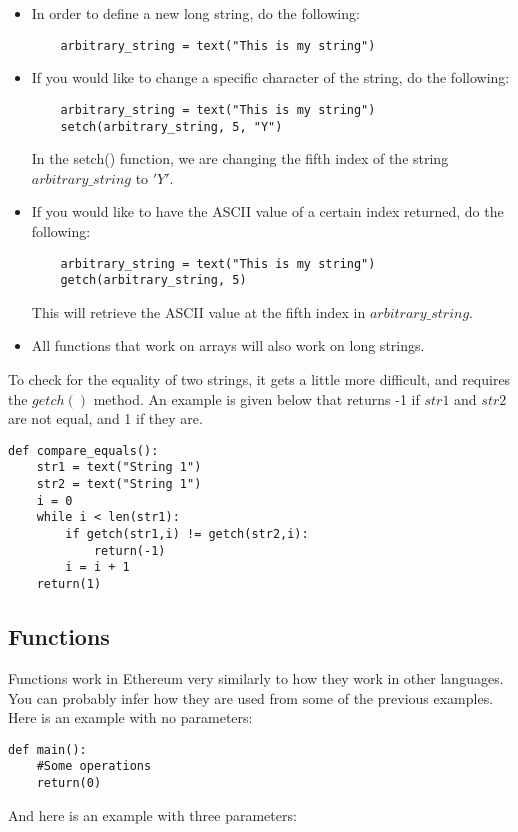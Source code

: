 \documentclass[12pt]{article}
\begin{document}
\begin{itemize}
\item In order to define a new long string, do the following:
	\begin{verbatim}
	arbitrary_string = text("This is my string")
	\end{verbatim}
\item If you would like to change a specific character of the string, do the following:
	\begin{verbatim}
	arbitrary_string = text("This is my string")
	setch(arbitrary_string, 5, "Y")
	\end{verbatim}
	In the setch() function, we are changing the fifth index of the string $arbitrary\_string$ to $'Y'$.
\item If you would like to have the ASCII value of a certain index returned, do the following:
	\begin{verbatim}
	arbitrary_string = text("This is my string")
	getch(arbitrary_string, 5)
	\end{verbatim}
	This will retrieve the ASCII value at the fifth index in $arbitrary\_string$.
\item All functions that work on arrays will also work on long strings.
\end{itemize} \cite{Serpent,Serpent1.0(old)}

To check for the equality of two strings, it gets a little more difficult, and requires the $getch()$ method. An example is given below that returns -1 if $str1$ and $str2$ are not equal, and 1 if they are.

\begin{verbatim}
def compare_equals():
	str1 = text("String 1")
	str2 = text("String 1")
	i = 0
	while i < len(str1):
		if getch(str1,i) != getch(str2,i):
			return(-1)
		i = i + 1
	return(1)
\end{verbatim}
	
\subsection{Functions}
Functions work in Ethereum very similarly to how they work in other languages. You can probably infer how they are used from some of the previous examples. Here is an example with no parameters:

\begin{verbatim}
def main():
	#Some operations
	return(0)
\end{verbatim}

And here is an example with three parameters:
\end{document}

